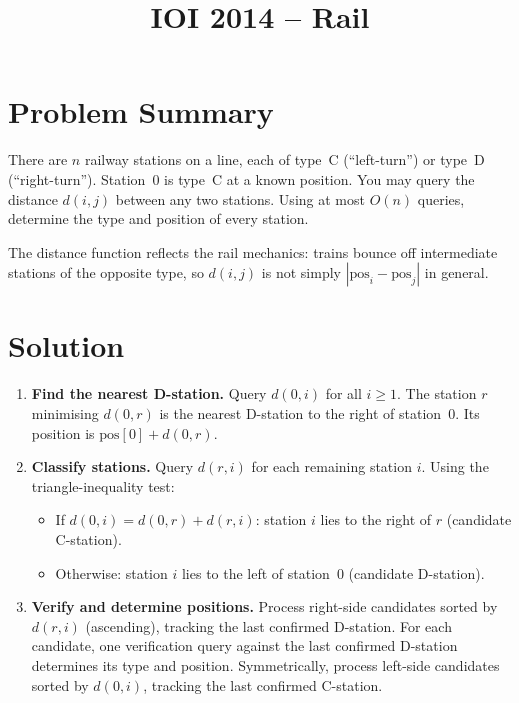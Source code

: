 \documentclass[11pt,a4paper]{article}
\title{IOI 2014 -- Rail}
\author{}
\date{}
\begin{document}
\maketitle

\section{Problem Summary}

There are $n$ railway stations on a line, each of type~C (``left-turn'') or type~D (``right-turn''). Station~0 is type~C at a known position. You may query the distance $d(i,j)$ between any two stations. Using at most $O(n)$ queries, determine the type and position of every station.

The distance function reflects the rail mechanics: trains bounce off intermediate stations of the opposite type, so $d(i,j)$ is not simply $|\text{pos}_i - \text{pos}_j|$ in general.

\section{Solution}

\begin{enumerate}
  \item \textbf{Find the nearest D-station.} Query $d(0, i)$ for all $i \ge 1$. The station $r$ minimising $d(0, r)$ is the nearest D-station to the right of station~0. Its position is $\text{pos}[0] + d(0, r)$.

  \item \textbf{Classify stations.} Query $d(r, i)$ for each remaining station $i$. Using the triangle-inequality test:
  \begin{itemize}
    \item If $d(0, i) = d(0, r) + d(r, i)$: station $i$ lies to the right of $r$ (candidate C-station).
    \item Otherwise: station $i$ lies to the left of station~0 (candidate D-station).
  \end{itemize}

  \item \textbf{Verify and determine positions.} Process right-side candidates sorted by $d(r, i)$ (ascending), tracking the last confirmed D-station. For each candidate, one verification query against the last confirmed D-station determines its type and position. Symmetrically, process left-side candidates sorted by $d(0, i)$, tracking the last confirmed C-station.
\end{enumerate}
\end{document}
